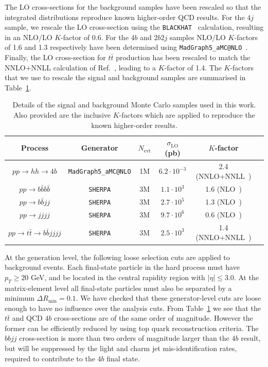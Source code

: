 The LO cross-sections for
the background samples have been rescaled so that the integrated
distributions reproduce known higher-order QCD results.
%
For the $4j$ sample, we rescale the LO cross-section
using the {\tt BLACKHAT}~\cite{Bern:2011ep}
calculation, resulting in
an NLO/LO $K$-factor of 0.6.
%
For the $4b$ and $2b2j$ samples NLO/LO $K$-factors of 1.6 and 1.3
respectively have been determined
using {\tt MadGraph5\_aMC@NLO}~\cite{Alwall:2014hca}.
%
Finally, the LO cross-section for $t\bar{t}$ production has been rescaled
to match the NNLO+NNLL calculation of Ref.~\cite{Czakon:2013goa}, leading
to a $K$-factor of 1.4.
%
The $K$-factors that we use to rescale
the signal and background samples are summarised in
Table~\ref{tab:samples}.

\begin{table}[h]
  \small
\begin{center}
\begin{tabular}{|c|c|c|c|c|c|}
\hline
Process &  Generator & $N_{\mathrm{evt}}$ & $\sigma_{\mathrm{LO}}$ (pb)  & $K$-factor \\
\hline
\hline
$pp \to hh\to 4b$ &  {\tt MadGraph5\_aMC@NLO} & 1M & $6.2\cdot10^{-3}$  &  2.4  (NNLO+NNLL~\cite{deFlorian:2013jea,deFlorian:2015moa}) \\
\hline
\hline
$pp \to b\bar{b}b\bar{b}$ &  {\tt SHERPA} & 3M &$1.1 \cdot10^3$  & 1.6 (NLO~\cite{Alwall:2014hca}) \\
$pp \to b\bar{b}jj$ &  {\tt SHERPA} & 3M & $2.7 \cdot 10^5$ & 1.3 (NLO~\cite{Alwall:2014hca}) \\
$pp \to jjjj$ &  {\tt SHERPA} & 3M  & $9.7\cdot 10^6$ &  0.6 (NLO~\cite{Bern:2011ep})\\
$pp \to t\bar{t}\to b\bar{b}jjjj$ &  {\tt SHERPA} & 3M & $2.5\cdot 10^3$   & 1.4 (NNLO+NNLL~\cite{Czakon:2013goa})\\
\hline
\end{tabular}
\caption{\small Details of the signal and background Monte
  Carlo samples used in this work.
  Also provided are the inclusive $K$-factors
  which are applied to reproduce the known
  higher-order results. \label{tab:samples}
} 
\end{center}
\end{table}%

At the generation level, the following loose selection 
cuts are applied to
background events.
%
Each final-state particle in the hard process must have $p_T \ge 20$ GeV, and be located
in the central  rapidity
region with
$| \eta | \le 3.0$.
%
At the matrix-element level
all final-state particles must also be separated by a minimum $\Delta R_{\mathrm{min}} =0.1$.
%
We have checked that these generator-level cuts are loose enough to have
no influence over the analysis cuts.
%
From Table~\ref{tab:samples}
we see that the $t\bar{t}$ and QCD $4b$ cross-sections are of
the same order of magnitude. However the former can be efficiently
reduced by using top quark reconstruction criteria.
%
The $bbjj$ cross-section is more than two orders
of magnitude larger than the $4b$ result, but will be suppressed
by the light and charm jet mis-identification rates,
required to contribute to the $4b$ final state.

